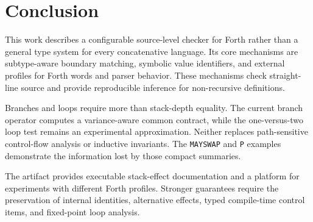 \documentclass[11pt,a4paper]{article}
\begin{document}
\section{Conclusion}

This work describes a configurable source-level checker for Forth rather than
a general type system for every concatenative language.  Its core mechanisms
are subtype-aware boundary matching, symbolic value identifiers, and external
profiles for Forth words and parser behavior.  These mechanisms check
straight-line source and provide reproducible inference
for non-recursive definitions.

Branches and loops require more than stack-depth equality.  The current branch
operator computes a variance-aware common contract, while the one-versus-two
loop test remains an experimental approximation.  Neither replaces
path-sensitive control-flow analysis or inductive invariants.  The
\texttt{MAYSWAP} and \texttt{P} examples demonstrate the information lost by
those compact summaries.

The artifact provides executable stack-effect documentation and a platform for
experiments with different Forth profiles.  Stronger guarantees require the
preservation of internal identities, alternative effects, typed compile-time
control items, and fixed-point loop analysis.
\end{document}

